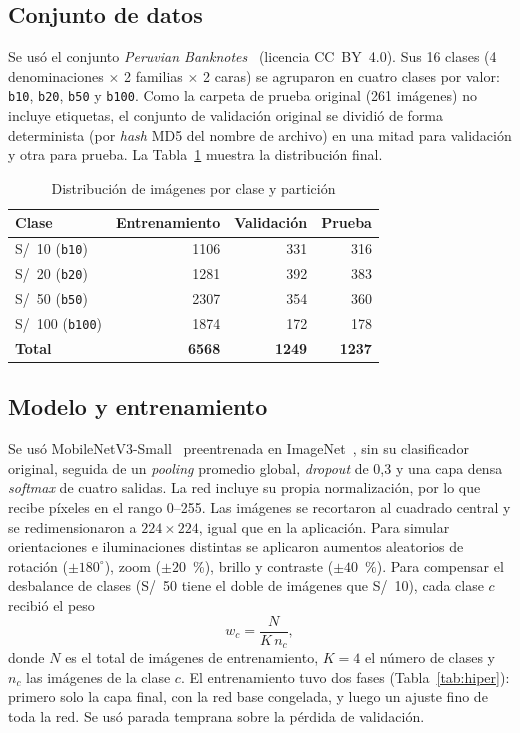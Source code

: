 \documentclass[conference,a4paper]{IEEEtran}
\begin{document}
\subsection{Conjunto de datos}

Se usó el conjunto \emph{Peruvian Banknotes}~\cite{mendeley2023} (licencia CC~BY~4.0). Sus 16 clases (4 denominaciones $\times$ 2 familias $\times$ 2 caras) se agruparon en cuatro clases por valor: \texttt{b10}, \texttt{b20}, \texttt{b50} y \texttt{b100}. Como la carpeta de prueba original (261 imágenes) no incluye etiquetas, el conjunto de validación original se dividió de forma determinista (por \emph{hash} MD5 del nombre de archivo) en una mitad para validación y otra para prueba. La Tabla~\ref{tab:datos} muestra la distribución final.

\begin{table}[!t]
\caption{Distribución de imágenes por clase y partición}
\label{tab:datos}
\centering
\footnotesize
\begin{tabular}{|l|r|r|r|}
\hline
\textbf{Clase} & \textbf{Entrenamiento} & \textbf{Validación} & \textbf{Prueba} \\
\hline
S/~10 (\texttt{b10}) & 1106 & 331 & 316 \\
S/~20 (\texttt{b20}) & 1281 & 392 & 383 \\
S/~50 (\texttt{b50}) & 2307 & 354 & 360 \\
S/~100 (\texttt{b100}) & 1874 & 172 & 178 \\
\hline
\textbf{Total} & \textbf{6568} & \textbf{1249} & \textbf{1237} \\
\hline
\end{tabular}
\end{table}

\subsection{Modelo y entrenamiento}

Se usó MobileNetV3-Small~\cite{howard2019} preentrenada en ImageNet~\cite{deng2009}, sin su clasificador original, seguida de un \emph{pooling} promedio global, \emph{dropout} de 0,3 y una capa densa \emph{softmax} de cuatro salidas. La red incluye su propia normalización, por lo que recibe píxeles en el rango 0--255. Las imágenes se recortaron al cuadrado central y se redimensionaron a $224\times224$, igual que en la aplicación. Para simular orientaciones e iluminaciones distintas se aplicaron aumentos aleatorios de rotación ($\pm180^\circ$), zoom ($\pm20$~\%), brillo y contraste ($\pm40$~\%). Para compensar el desbalance de clases (S/~50 tiene el doble de imágenes que S/~10), cada clase $c$ recibió el peso
\begin{equation}
w_c = \frac{N}{K\, n_c},
\end{equation}
donde $N$ es el total de imágenes de entrenamiento, $K=4$ el número de clases y $n_c$ las imágenes de la clase $c$. El entrenamiento tuvo dos fases (Tabla~\ref{tab:hiper}): primero solo la capa final, con la red base congelada, y luego un ajuste fino de toda la red. Se usó parada temprana sobre la pérdida de validación.
\end{document}

